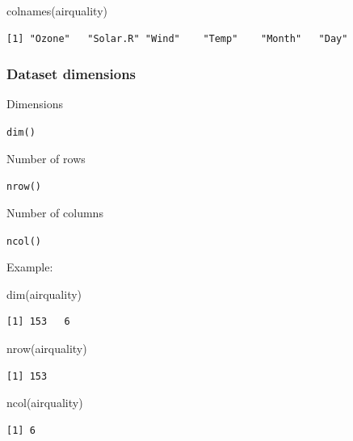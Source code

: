 \documentclass[
  letterpaper,
  DIV=11,
  numbers=noendperiod]{scrreprt}
\newenvironment{Shaded}{\begin{snugshade}}{\end{snugshade}}
\newcommand{\FunctionTok}[1]{\textcolor[rgb]{0.28,0.35,0.67}{#1}}
\newcommand{\NormalTok}[1]{\textcolor[rgb]{0.00,0.23,0.31}{#1}}
\begin{document}
\begin{Shaded}
\begin{Highlighting}[]
\FunctionTok{colnames}\NormalTok{(airquality)}
\end{Highlighting}
\end{Shaded}

\begin{verbatim}
[1] "Ozone"   "Solar.R" "Wind"    "Temp"    "Month"   "Day"    
\end{verbatim}

\subsubsection{Dataset dimensions}\label{dataset-dimensions}

Dimensions

\texttt{dim()}

Number of rows

\texttt{nrow()}

Number of columns

\texttt{ncol()}

Example:

\begin{Shaded}
\begin{Highlighting}[]
\FunctionTok{dim}\NormalTok{(airquality)}
\end{Highlighting}
\end{Shaded}

\begin{verbatim}
[1] 153   6
\end{verbatim}

\begin{Shaded}
\begin{Highlighting}[]
\FunctionTok{nrow}\NormalTok{(airquality)}
\end{Highlighting}
\end{Shaded}

\begin{verbatim}
[1] 153
\end{verbatim}

\begin{Shaded}
\begin{Highlighting}[]
\FunctionTok{ncol}\NormalTok{(airquality)}
\end{Highlighting}
\end{Shaded}

\begin{verbatim}
[1] 6
\end{verbatim}
\end{document}
